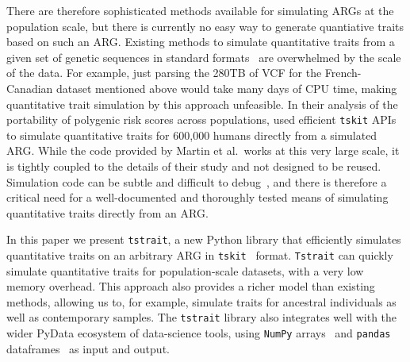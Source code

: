 \documentclass[unnumsec,webpdf,modern,large,namedate]{oup-authoring-template}%
\begin{document}
There are therefore sophisticated methods available for simulating
ARGs at the population scale, but there is currently no
easy way to generate quantiative traits based on such an ARG.
Existing methods to simulate quantitative traits from a given set of
genetic sequences in standard formats~\citep[e.g.][]{meyer2018,fernandes2020}
are overwhelmed by the scale of the data. For example,
just parsing the 280TB of VCF for the French-Canadian
dataset mentioned above would take many days of CPU time,
making quantitative trait simulation by this approach unfeasible.
In their analysis of the portability of polygenic risk
scores across populations, \citet{martin2017}
used efficient \texttt{tskit} APIs to simulate quantitative
traits for 600,000 humans directly from a simulated ARG.
While the code provided by Martin et al.\ works at this
very large scale, it is tightly coupled to the details of their study
and not designed to be reused.
Simulation code can be subtle and difficult to
debug~\citep{ragsdale2020lessons}, and there
is therefore a critical need for a well-documented and
thoroughly tested means of simulating quantitative
traits directly from an ARG.

In this paper we present \texttt{tstrait}, a new Python library that
efficiently simulates quantitative traits on an arbitrary ARG
in \texttt{tskit}~\citep{ralph2020} format.
\texttt{Tstrait} can
quickly simulate quantitative traits for population-scale datasets,
with a very low memory overhead. This approach also provides a
richer model than existing methods,
allowing us to, for example, simulate traits for
ancestral individuals as well as contemporary samples.
The \texttt{tstrait} library also integrates well with the wider
PyData ecosystem of data-science tools,
using
\texttt{NumPy} arrays~\citep{numpy} and
\texttt{pandas} dataframes~\citep{pandas}
as input and output.
\end{document}
